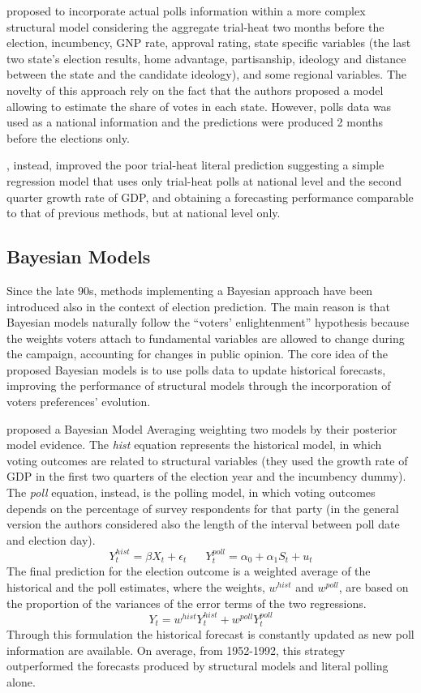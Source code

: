 \documentclass[
  12pt]{article}
\begin{document}
\citet{gel:kin:1993} proposed to incorporate actual polls information
within a more complex structural model considering the aggregate
trial-heat two months before the election, incumbency, GNP rate,
approval rating, state specific variables (the last two state's election
results, home advantage, partisanship, ideology and distance between the
state and the candidate ideology), and some regional variables. The
novelty of this approach rely on the fact that the authors proposed a
model allowing to estimate the share of votes in each state. However,
polls data was used as a national information and the predictions were
produced 2 months before the elections only.

\citet{cam:1996}, instead, improved the poor trial-heat literal
prediction suggesting a simple regression model that uses only
trial-heat polls at national level and the second quarter growth rate of
GDP, and obtaining a forecasting performance comparable to that of
previous methods, but at national level only.

\hypertarget{bayesian-models}{%
\subsection{Bayesian Models}\label{bayesian-models}}

Since the late 90s, methods implementing a Bayesian approach have been
introduced also in the context of election prediction. The main reason
is that Bayesian models naturally follow the ``voters' enlightenment''
hypothesis because the weights voters attach to fundamental variables
are allowed to change during the campaign, accounting for changes in
public opinion. The core idea of the proposed Bayesian models is to use
polls data to update historical forecasts, improving the performance of
structural models through the incorporation of voters preferences'
evolution.

\citet{bro:cha:1999} proposed a Bayesian Model Averaging weighting two
models by their posterior model evidence. The \emph{hist} equation
represents the historical model, in which voting outcomes are related to
structural variables (they used the growth rate of GDP in the first two
quarters of the election year and the incumbency dummy). The \emph{poll}
equation, instead, is the polling model, in which voting outcomes
depends on the percentage of survey respondents for that party (in the
general version the authors considered also the length of the interval
between poll date and election day).
\[Y_{t}^{hist} = \beta X_t + \epsilon_t \;\;\;\;\;\; Y_{t}^{poll} = \alpha_0 + \alpha_1 S_t + u_t\]
The final prediction for the election outcome is a weighted average of
the historical and the poll estimates, where the weights, \(w^{hist}\)
and \(w^{poll}\), are based on the proportion of the variances of the
error terms of the two regressions.
\[Y_{t} =  w^{hist} Y_{t}^{hist} + w^{poll} Y_{t}^{poll}\] Through this
formulation the historical forecast is constantly updated as new poll
information are available. On average, from 1952-1992, this strategy
outperformed the forecasts produced by structural models and literal
polling alone.
\end{document}
